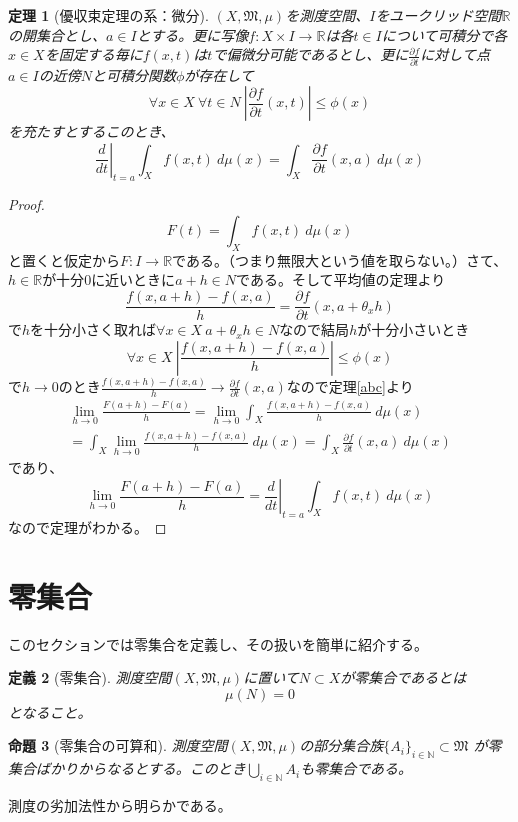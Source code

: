 \documentclass[leqno]{jsarticle}
\newtheorem{thm}{定理}
\newtheorem{prop}[thm]{命題}
\newtheorem{df}[thm]{定義}
\newcommand{\nn}{\mathbb{N}}
\newcommand{\rr}{\mathbb{R}}
\newcommand{\dpst}{\displaystyle}
\newcommand{\mm}{\mathfrak{M}}
\begin{document}
\begin{thm}[優収束定理の系：微分]$(X,\mm,\mu)$を測度空間、$I$をユークリッド空間$\rr$の開集合とし、$a\in I$とする。更に写像$f:X\times I\to \rr$は各$t\in I$について可積分で各$x\in X$を固定する毎に$f(x,t)$は$t$で偏微分可能であるとし、更に$\dpst \frac{\partial f}{\partial t}$に対して点$a\in I$の近傍$N$と可積分関数$\phi$が存在して
\[
\forall x\in X\ \forall t\in N\ \left|\frac{\partial f}{\partial t}(x,t)\right|\le \phi(x)
\]を充たすとするこのとき、
\[
\left.\frac{d}{dt}\right|_{t=a}\int_X f(x,t)\ d\mu(x)=\int_X \frac{\partial f}{\partial t}(x,a)\ d\mu(x)
\]
\end{thm}
\begin{proof}
\[
F(t)=\int_X f(x,t)\ d\mu(x)
\]
と置くと仮定から$F:I\to \rr$である。（つまり無限大という値を取らない。）さて、$h\in \rr$が十分$0$に近いときに$a+h\in N$である。そして平均値の定理より
\[
\frac{f(x,a+h)-f(x,a)}{h}=\frac{\partial f}{\partial t}(x,a+\theta_xh)
\]
で$h$を十分小さく取れば$\forall x\in X\ a+\theta_xh\in N$なので結局$h$が十分小さいとき
\[
\forall x\in X\ \left|\frac{f(x,a+h)-f(x,a)}{h}\right|\le \phi(x)
\]
で$h\to 0$のとき$\dpst \frac{f(x,a+h)-f(x,a)}{h}\to \frac{\partial f}{\partial t}(x,a)$なので定理\ref{abc}より
\begin{eqnarray*}
\lim_{h\to 0}\frac{F(a+h)-F(a)}{h}=\lim_{h\to 0}\int_X\frac{f(x,a+h)-f(x,a)}{h}\ d\mu(x)\\ 
=\int_X\lim_{h\to 0}\frac{f(x,a+h)-f(x,a)}{h}\ d\mu(x)=\int_X \frac{\partial f}{\partial t}(x,a)\ d\mu(x)
\end{eqnarray*}
であり、
\[
\lim_{h\to 0}\frac{F(a+h)-F(a)}{h}=\left.\frac{d}{dt}\right|_{t=a}\int_X f(x,t)\ d\mu(x)
\]
なので定理がわかる。
\end{proof}

\section{零集合}
このセクションでは零集合を定義し、その扱いを簡単に紹介する。

\begin{df}[零集合]
測度空間$(X,\mm,\mu)$に置いて$N\subset X$が零集合であるとは
\[
\mu(N)=0
\]
となること。
\end{df}


\begin{prop}[零集合の可算和]測度空間$(X,\mm,\mu)$の部分集合族$\{A_i\}_{i\in \nn}\subset \mm$
が零集合ばかりからなるとする。このとき$\dpst \bigcup_{i\in \nn}A_i$も零集合である。
\end{prop}
{\proof 測度の劣加法性から明らかである。}
\end{document}
